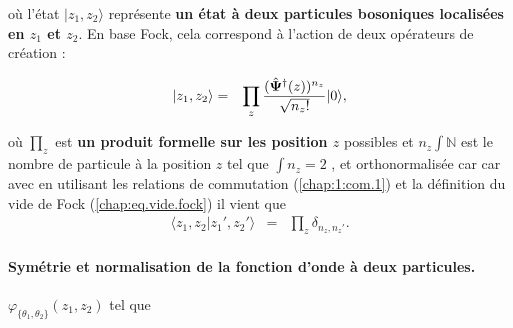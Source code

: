 

où l'état $\vert z_1 , z_2 \rangle$ représente {\bf un état à deux particules bosoniques localisées en $z_1$ et $z_2$}. En base Fock, cela correspond à l’action de deux opérateurs de création :

\begin{eqnarray}
	\vert z_1 , z_2 \rangle  & = &  \prod_z\frac{(\hat{\bm{\Psi}}^\dag(z))^{n_z}}{\sqrt{n_z !}} \vert 0 \rangle ,
\end{eqnarray}

où $\prod_z$ est {\bf un produit formelle sur les position $z$} possibles et $n_z \int \mathbb{N}$ est le nombre de particule à la position $z$ tel que $\int n_z = 2$ , et orthonormalisée car car avec en utilisant les relations de commutation (\ref{chap:1:com.1})  et la définition du vide de Fock (\ref{chap:eq.vide.fock}) il vient que 
\begin{eqnarray}
	\langle z_1 , z_2 \vert z_1' , z_2' \rangle  & = & \prod_z\delta_{n_z^{},n_z'}.
\end{eqnarray}





\paragraph{Symétrie et normalisation de la fonction d’onde à deux particules.}
\(\varphi_{\{\theta_1 , \theta_2\}}(z_1, z_2)\) tel que 

